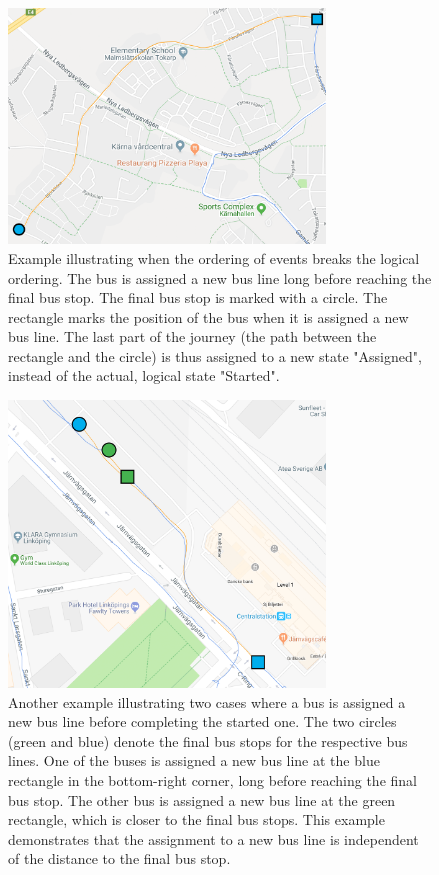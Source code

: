 \begin{figure}[t!]
    \centering
    \includegraphics[width=0.75\textwidth]{figures/assigned_completed_problem_long}
    \caption{Example illustrating when the ordering of events breaks the logical ordering.
    The bus is assigned a new bus line long before reaching the final bus stop.
    The final bus stop is marked with a circle.
    The rectangle marks the position of the bus when it is assigned a new bus line.
    The last part of the journey (the path between the rectangle and the circle) is thus assigned to a new state "Assigned", instead of the actual, logical state "Started".}
    \label{fig:assigned-before-completed-long}
\end{figure}

\begin{figure}[t!]
    \centering
    \includegraphics[width=0.75\textwidth]{figures/assigned_completed_problem}
    \caption{Another example illustrating two cases where a bus is assigned a new bus line before completing the started one.
    The two circles (green and blue) denote the final bus stops for the respective bus lines.
    One of the buses is assigned a new bus line at the blue rectangle in the bottom-right corner, long before reaching the final bus stop.
    The other bus is assigned a new bus line at the green rectangle, which is closer to the final bus stops.
    This example demonstrates that the assignment to a new bus line is independent of the distance to the final bus stop.}
    \label{fig:assigned-before-completed}
\end{figure}

